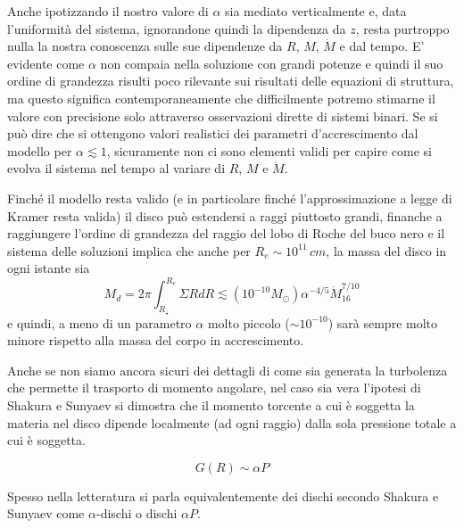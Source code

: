 \documentclass[a4paperbi]{article}
\begin{document}
	Anche ipotizzando il nostro valore di $\alpha$ sia mediato verticalmente e, data l'uniformità del sistema, ignorandone quindi la dipendenza da $z$, resta purtroppo nulla la nostra conoscenza sulle sue dipendenze da $R$, $M$, $\dot{M}$ e dal tempo.
	E' evidente come $\alpha$ non compaia nella soluzione con grandi potenze e quindi il suo ordine di grandezza risulti poco rilevante sui risultati delle equazioni di struttura, ma questo significa contemporaneamente che difficilmente potremo stimarne il valore con precisione solo attraverso osservazioni dirette di sistemi binari. 	
	Se si può dire che si ottengono valori realistici dei parametri d'accrescimento dal modello per $\alpha\lesssim1$, sicuramente non ci sono elementi validi per capire come si evolva il sistema nel tempo al variare di $R$, $M$ e $\dot{M}$.
	
	Finché il modello resta valido (e in particolare finché l'approssimazione a legge di Kramer resta valida) il disco può estendersi a raggi piuttosto grandi, finanche a raggiungere l'ordine di grandezza del raggio del lobo di Roche del buco nero e il sistema delle soluzioni implica che anche per $R_e\sim10^{11}\,cm$, la massa del disco in ogni istante sia
	\begin{equation}
		M_d=2\pi\int^{R_{e}}_{R_\star}\Sigma RdR\lesssim (10^{-10}M_\odot)\alpha^{-4/5}\dot{M}^{7/10}_{16}
	\end{equation}
	e quindi, a meno di un parametro $\alpha$ molto piccolo ($\sim10^{-10}$) sarà sempre molto minore rispetto alla massa del corpo in accrescimento.
		
	Anche se non siamo ancora sicuri dei dettagli di come sia generata la turbolenza che permette il trasporto di momento angolare, nel caso sia vera l'ipotesi di Shakura e Sunyaev si dimostra che il momento torcente a cui è soggetta la materia nel disco dipende localmente (ad ogni raggio) dalla sola pressione totale a cui è soggetta.

	\begin{equation}
		G(R)\sim\alpha P
	\end{equation}
	
	Spesso nella letteratura si parla equivalentemente dei dischi secondo Shakura e Sunyaev come $\alpha$-dischi o dischi $\alpha P$.
	
\end{document}
